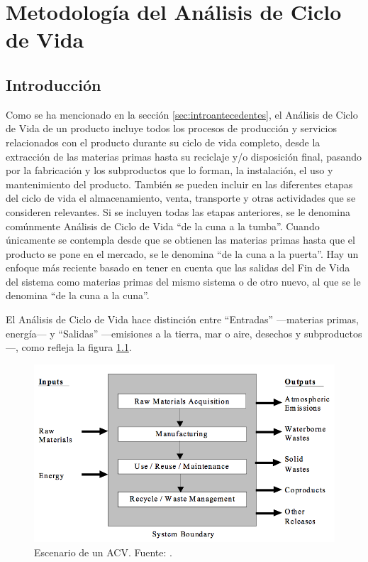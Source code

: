 \chapter{Metodología del Análisis de Ciclo de Vida}\label{cap:metodologia_acv}
\section{Introducción}

Como se ha mencionado en la sección \ref{sec:introantecedentes}, el Análisis de Ciclo de Vida de un producto incluye todos los procesos de producción y servicios relacionados con el producto durante su ciclo de vida completo, desde la extracción de las materias primas hasta su reciclaje y/o disposición final, pasando por la fabricación y los subproductos que lo forman, la instalación, el uso y mantenimiento del producto. También se pueden incluir en las diferentes etapas del ciclo de vida el almacenamiento, venta, transporte y otras actividades que se consideren relevantes. Si se incluyen todas las etapas anteriores, se le denomina comúnmente Análisis de Ciclo de Vida ``de la cuna a la tumba''. Cuando únicamente se contempla desde que se obtienen las materias primas hasta que el producto se pone en el mercado, se le denomina ``de la cuna a la puerta''. Hay un enfoque más reciente basado en tener en cuenta que las salidas del Fin de Vida del sistema como materias primas del mismo sistema o de otro nuevo, al que se le denomina ``de la cuna a la cuna''.


El Análisis de Ciclo de Vida hace distinción entre ``Entradas'' —materias primas, energía— y ``Salidas'' —emisiones a la tierra, mar o aire, desechos y subproductos—, como refleja la figura \ref{fig:escenariolca}.

\begin{figure}[!htb]
\centering
\includegraphics[width=12cm]{img/escenariolca.png}
\caption[Escenario de un ACV.]{Escenario de un ACV. Fuente: \protect\cite{epa}.}
\label{fig:escenariolca}
\end{figure}

